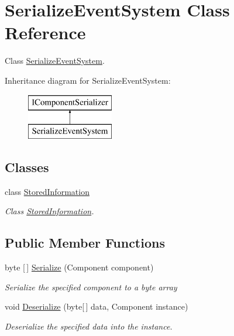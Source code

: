 \hypertarget{class_serialize_event_system}{}\section{Serialize\+Event\+System Class Reference}
\label{class_serialize_event_system}


Class \hyperlink{class_serialize_event_system}{Serialize\+Event\+System}.  


Inheritance diagram for Serialize\+Event\+System\+:\begin{figure}[H]
\begin{center}
\leavevmode
\includegraphics[height=2.000000cm]{class_serialize_event_system}
\end{center}
\end{figure}
\subsection*{Classes}
\begin{DoxyCompactItemize}
\item 
class \hyperlink{class_serialize_event_system_1_1_stored_information}{Stored\+Information}
\begin{DoxyCompactList}\small\item\em Class \hyperlink{class_serialize_event_system_1_1_stored_information}{Stored\+Information}. \end{DoxyCompactList}\end{DoxyCompactItemize}
\subsection*{Public Member Functions}
\begin{DoxyCompactItemize}
\item 
byte \mbox{[}$\,$\mbox{]} \hyperlink{class_serialize_event_system_a433cd679d73a8b4c4823e960b224231b}{Serialize} (Component component)
\begin{DoxyCompactList}\small\item\em Serialize the specified component to a byte array \end{DoxyCompactList}\item 
void \hyperlink{class_serialize_event_system_a27ee6101f51abf181d2bdf755708cdeb}{Deserialize} (byte\mbox{[}$\,$\mbox{]} data, Component instance)
\begin{DoxyCompactList}\small\item\em Deserialize the specified data into the instance. \end{DoxyCompactList}\end{DoxyCompactItemize}


